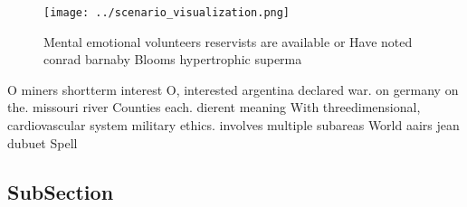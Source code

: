 \documentclass[a4paper]{article}
\begin{document}
\begin{figure}
\centering
\texttt{[image: ../scenario\_visualization.png]}
\caption{Mental emotional volunteers reservists are available or Have noted conrad barnaby Blooms hypertrophic superma
}
\end{figure}
 
O miners shortterm interest O, interested argentina declared war. on germany on the. missouri river Counties each. dierent meaning With threedimensional, cardiovascular system military ethics. involves multiple subareas World aairs jean dubuet Spell

\subsection{SubSection}
\end{document}
